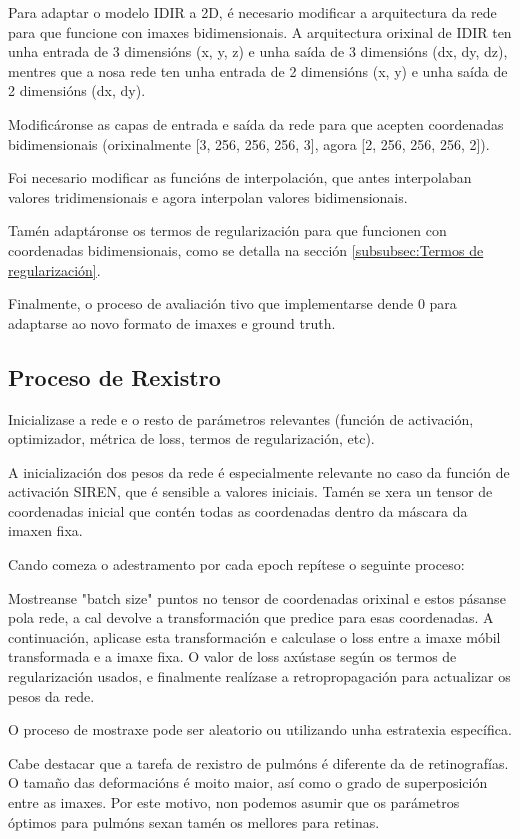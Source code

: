 Para adaptar o modelo IDIR a 2D, é necesario modificar a arquitectura da rede para que funcione con imaxes bidimensionais.
A arquitectura orixinal de IDIR ten unha entrada de 3 dimensións (x, y, z) e unha saída de 3 dimensións (dx, dy, dz),
mentres que a nosa rede ten unha entrada de 2 dimensións (x, y) e unha saída de 2 dimensións (dx, dy).

Modificáronse as capas de entrada e saída da rede para que acepten coordenadas bidimensionais (orixinalmente [3, 256, 256, 256, 3], agora [2, 256, 256, 256, 2]).

Foi necesario modificar as funcións de interpolación, que antes interpolaban valores tridimensionais e agora interpolan valores bidimensionais.

Tamén adaptáronse os termos de regularización para que funcionen con coordenadas bidimensionais, como se detalla na sección \ref{subsubsec:Termos de regularización}.

Finalmente, o proceso de avaliación tivo que implementarse dende 0 para adaptarse ao novo formato de imaxes e ground truth.

\subsection{Proceso de Rexistro}
\label{subsec:Proceso de Rexistro}

Inicializase a rede e o resto de parámetros relevantes (función de activación, optimizador, métrica de loss, termos de regularización, etc).

A inicialización dos pesos da rede é especialmente relevante no caso da función de activación SIREN, que é sensible a valores iniciais.
Tamén se xera un tensor de coordenadas inicial que contén todas as coordenadas dentro da máscara da imaxen fixa.

Cando comeza o adestramento por cada epoch repítese o seguinte proceso:

Mostreanse "batch size" puntos no tensor de coordenadas orixinal e estos pásanse pola rede, 
a cal devolve a transformación que predice para esas coordenadas.
A continuación, aplicase esta transformación e calculase o loss entre a imaxe móbil transformada e a imaxe fixa.
O valor de loss axústase según os termos de regularización usados, e finalmente realízase a retropropagación para actualizar os pesos da rede.

O proceso de mostraxe pode ser aleatorio ou utilizando unha estratexia específica.

Cabe destacar que a tarefa de rexistro de pulmóns é diferente da de retinografías. O tamaño das deformacións é moito maior, así como o grado de superposición entre as imaxes.
Por este motivo, non podemos asumir que os parámetros óptimos para pulmóns sexan tamén os mellores para retinas.

